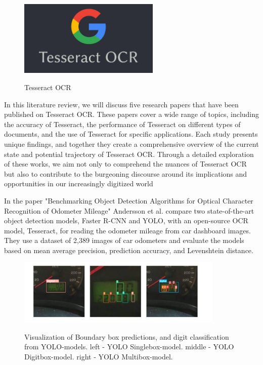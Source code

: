 \vspace{1cm}

\begin{figure}[ht]
    \centering
    \includegraphics[width=0.6\textwidth]{Figures/tesseract_ocr.jpg}
    \caption[Tesseract OCR]{Tesseract OCR}\cite{liTrOCRTransformerBasedOptical2023}
    \label{fig:Tesseract OCR}
\end{figure}


In this literature review, we will discuss five research papers that have been published on Tesseract OCR. These papers cover a wide range of topics, including the accuracy of Tesseract, the performance of Tesseract on different types of documents, and the use of Tesseract for specific applications. Each study presents unique findings, and together they create a comprehensive overview of the current state and potential trajectory of Tesseract OCR. Through a detailed exploration of these works, we aim not only to comprehend the nuances of Tesseract OCR but also to contribute to the burgeoning discourse around its implications and opportunities in our increasingly digitized world

In the paper "Benchmarking Object Detection Algorithms for Optical Character Recognition of Odometer Mileage" Andersson et al. compare two state-of-the-art object detection models, Faster R-CNN and YOLO, with an open-source OCR model, Tesseract, for reading the odometer mileage from car dashboard images. They use a dataset of 2,389 images of car odometers and evaluate the models based on mean average precision, prediction accuracy, and Levenshtein distance.

\begin{figure}[ht]
    \centering
    \includegraphics[width=0.88\textwidth]{Figures/tesseract_papers/Andersson_2022.jpg}
    \caption[Visualization of Boundary box predictions, and digit classification from
        YOLO-models. left - YOLO Singlebox-model. middle - YOLO Digitbox-model. right - YOLO
        Multibox-model.]{Visualization of Boundary box predictions, and digit classification from
        YOLO-models. left - YOLO Singlebox-model. middle - YOLO Digitbox-model. right - YOLO
        Multibox-model.}\cite{anderssonBenchmarkingObjectDetection2022}
    \label{fig:Andersson Visualisation of Boundary box predictions}
\end{figure}


